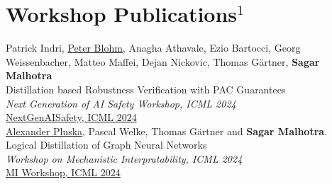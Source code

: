 \documentclass[10pt, a4paper]{article}
\newcommand{\years}[1]{\marginnote{\scriptsize #1}}
\begin{document}
\section*{Workshop Publications$^{1}$}
\noindent

\years{2024} Patrick Indri, \underline{Peter Blohm}, Anagha Athavale, Ezio Bartocci, Georg Weissenbacher, Matteo Maffei, Dejan Nickovic, Thomas Gärtner, \textbf{Sagar Malhotra}\\
Distillation based Robustness Verification with PAC Guarantees\\
\emph{Next Generation of AI Safety Workshop, ICML 2024}\\
\href{https://openreview.net/forum?id=vflefS3lmB}{NextGenAISafety, ICML 2024}\\

\years{2024}\underline{Alexander Pluska}, Pascal Welke, Thomas G{\"a}rtner and \textbf{Sagar Malhotra}.\\
Logical Distillation of Graph Neural Networks\\
\emph{Workshop on Mechanistic Interpratability, ICML 2024}\\
\href{https://openreview.net/forum?id=TfYnD2gYRO}{MI Workshop, ICML 2024}\\ \\
\end{document}
